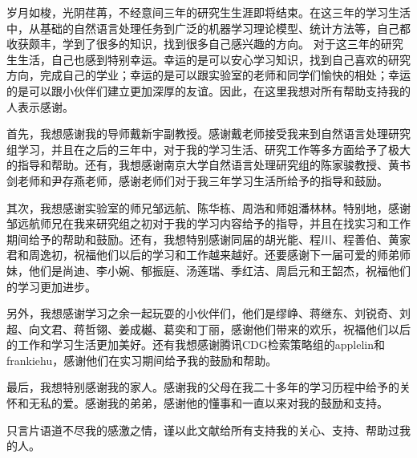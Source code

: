\documentclass[master]{njuthesis}
\begin{document}
\begin{acknowledgement}


岁月如梭，光阴荏苒，不经意间三年的研究生生涯即将结束。在这三年的学习生活中，从基础的自然语言处理任务到广泛的机器学习理论模型、统计方法等，自己都收获颇丰，学到了很多的知识，找到很多自己感兴趣的方向。 对于这三年的研究生生活，自己也感到特别幸运。幸运的是可以安心学习知识，找到自己喜欢的研究方向，完成自己的学业；幸运的是可以跟实验室的老师和同学们愉快的相处；幸运的是可以跟小伙伴们建立更加深厚的友谊。因此，在这里我想对所有帮助支持我的人表示感谢。

首先，我想感谢我的导师戴新宇副教授。感谢戴老师接受我来到自然语言处理研究组学习，并且在之后的三年中，对于我的学习生活、研究工作等多方面给予了极大的指导和帮助。还有，我想感谢南京大学自然语言处理研究组的陈家骏教授、黄书剑老师和尹存燕老师，感谢老师们对于我三年学习生活所给予的指导和鼓励。

其次，我想感谢实验室的师兄邹远航、陈华栋、周浩和师姐潘林林。特别地，感谢邹远航师兄在我来研究组之初对于我的学习内容给予的指导，并且在找实习和工作期间给予的帮助和鼓励。还有，我想特别感谢同届的胡光能、程川、程善伯、黄家君和周逸初，祝福他们以后的学习和工作越来越好。还要感谢下一届可爱的师弟师妹，他们是尚迪、李小婉、郁振庭、汤莲瑞、季红洁、周启元和王韶杰，祝福他们的学习更加进步。

另外，我想感谢学习之余一起玩耍的小伙伴们，他们是缪峥、蒋继东、刘锐奇、刘超、向文君、蒋哲翎、姜成樾、葛奕和丁丽，感谢他们带来的欢乐，祝福他们以后的工作和学习生活更加美好。还有我想感谢腾讯CDG检索策略组的applelin和frankiehu，感谢他们在实习期间给予我的鼓励和帮助。

最后，我想特别感谢我的家人。感谢我的父母在我二十多年的学习历程中给予的关怀和无私的爱。感谢我的弟弟，感谢他的懂事和一直以来对我的鼓励和支持。

只言片语道不尽我的感激之情，谨以此文献给所有支持我的关心、支持、帮助过我的人。


\end{acknowledgement}

\end{document}
